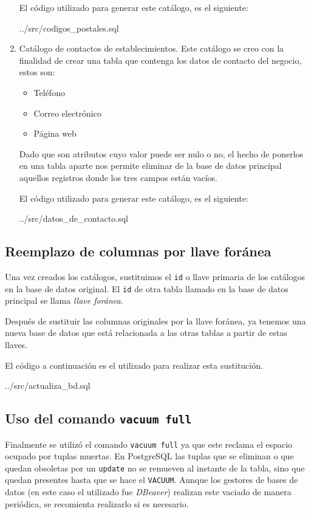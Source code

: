 \documentclass{article}
\begin{document}
\begin{enumerate}
    El código utilizado para generar este catálogo, es el siguiente:

    
    {../src/codigos_postales.sql}

    \item Catálogo de contactos de establecimientos.
    Este catálogo se creo con la finalidad de crear una tabla que contenga los
    datos de contacto del negocio, estos son:

    \begin{itemize}
        \item Teléfono
        \item Correo electrónico
        \item Página web
    \end{itemize}

    Dado que son atributos cuyo valor puede ser nulo o no, el hecho de ponerlos
    en una tabla aparte nos permite eliminar de la base de datos principal
    aquellos registros donde los tres campos están vacíos.

    El código utilizado para generar este catálogo, es el siguiente:

    
    {../src/datos_de_contacto.sql}

\end{enumerate}

\subsection{Reemplazo de columnas por llave foránea}

Una vez creados los catálogos, sustituimos el \texttt{id} o llave primaria de
los catálogos en la base de datos original. El \texttt{id} de otra tabla llamado
en la base de datos principal se llama \textit{llave foránea}.

Después de sustituir las columnas originales por la llave foránea, ya tenemos
una nueva base de datos que está relacionada a las otras tablas a partir de
estas llaves.

El código a continuación es el utilizado para realizar esta sustitución.


{../src/actualiza_bd.sql}

\subsection{Uso del comando \texttt{vacuum full}}
Finalmente se utilizó el comando \texttt{vacuum full} ya que este reclama el
espacio ocupado por tuplas muertas. En PostgreSQL las tuplas que se eliminan o
que quedan obsoletas por un \texttt{update} no se remueven al instante de la
tabla, sino que quedan presentes hasta que se hace el \texttt{VACUUM}. Aunque
los gestores de bases de datos (en este caso el utilizado fue \textit{DBeaver})
realizan este vaciado de manera periódica, se recomienta realizarlo si es
necesario.
\end{document}
